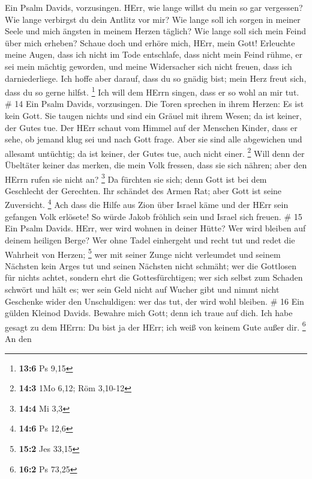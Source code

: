  Ein Psalm Davids, vorzusingen.  HErr, wie lange
willst du mein so gar vergessen? Wie lange verbirgst du dein Antlitz vor
mir?  Wie lange soll ich sorgen in meiner Seele und mich
ängsten in meinem Herzen täglich? Wie lange soll sich mein Feind über
mich erheben?  Schaue doch und erhöre mich, HErr, mein Gott!
Erleuchte meine Augen, dass ich nicht im Tode entschlafe, 
dass nicht mein Feind rühme, er sei mein mächtig geworden, und meine
Widersacher sich nicht freuen, dass ich darniederliege.  Ich
hoffe aber darauf, dass du so gnädig bist; mein Herz freut sich, dass du
so gerne hilfst. \footnote{\textbf{13:6} Ps 9,15}  Ich will
dem HErrn singen, dass er so wohl an mir tut. \# 14  Ein
Psalm Davids, vorzusingen. Die Toren sprechen in ihrem Herzen: Es ist
kein Gott. Sie taugen nichts und sind ein Gräuel mit ihrem Wesen; da ist
keiner, der Gutes tue.  Der HErr schaut vom Himmel auf der
Menschen Kinder, dass er sehe, ob jemand klug sei und nach Gott frage.
 Aber sie sind alle abgewichen und allesamt untüchtig; da
ist keiner, der Gutes tue, auch nicht einer. \footnote{\textbf{14:3} 1Mo
  6,12; Röm 3,10-12}  Will denn der Übeltäter keiner das
merken, die mein Volk fressen, dass sie sich nähren; aber den HErrn
rufen sie nicht an? \footnote{\textbf{14:4} Mi 3,3}  Da
fürchten sie sich; denn Gott ist bei dem Geschlecht der Gerechten.
 Ihr schändet des Armen Rat; aber Gott ist seine Zuversicht.
\footnote{\textbf{14:6} Ps 12,6}  Ach dass die Hilfe aus
Zion über Israel käme und der HErr sein gefangen Volk erlösete! So würde
Jakob fröhlich sein und Israel sich freuen. \# 15  Ein Psalm
Davids. HErr, wer wird wohnen in deiner Hütte? Wer wird bleiben auf
deinem heiligen Berge?  Wer ohne Tadel einhergeht und recht
tut und redet die Wahrheit von Herzen; \footnote{\textbf{15:2} Jes 33,15}
 wer mit seiner Zunge nicht verleumdet und seinem Nächsten
kein Arges tut und seinen Nächsten nicht schmäht;  wer die
Gottlosen für nichts achtet, sondern ehrt die Gottesfürchtigen; wer sich
selbst zum Schaden schwört und hält es;  wer sein Geld nicht
auf Wucher gibt und nimmt nicht Geschenke wider den Unschuldigen: wer
das tut, der wird wohl bleiben. \# 16  Ein gülden Kleinod
Davids. Bewahre mich Gott; denn ich traue auf dich.  Ich
habe gesagt zu dem HErrn: Du bist ja der HErr; ich weiß von keinem Gute
außer dir. \footnote{\textbf{16:2} Ps 73,25}  An den
